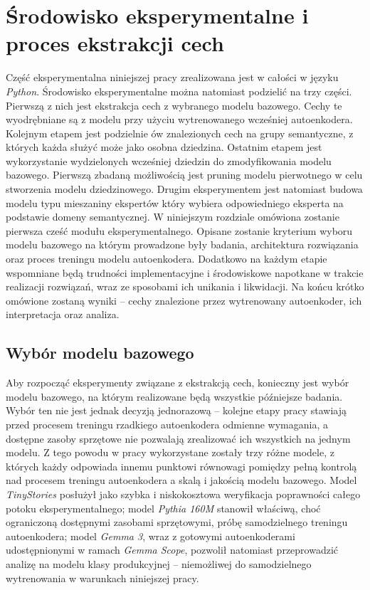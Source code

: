 \chapter{Środowisko eksperymentalne i proces ekstrakcji cech}
Część eksperymentalna niniejszej pracy zrealizowana jest w całości w języku \textit{Python}. Środowisko eksperymentalne można natomiast podzielić na trzy części. Pierwszą z nich jest ekstrakcja cech z wybranego modelu bazowego. Cechy te wyodrębniane są z modelu przy użyciu wytrenowanego wcześniej autoenkodera. Kolejnym etapem jest podzielnie ów znalezionych cech na grupy semantyczne, z których każda służyć może jako osobna dziedzina. Ostatnim etapem jest wykorzystanie wydzielonych wcześniej dziedzin do zmodyfikowania modelu bazowego. Pierwszą zbadaną możliwością jest pruning modelu pierwotnego w celu stworzenia modelu dziedzinowego. Drugim eksperymentem jest natomiast budowa modelu typu mieszaniny ekspertów który wybiera odpowiedniego eksperta na podstawie domeny semantycznej. \newline
W niniejszym rozdziale omówiona zostanie pierwsza cześć modułu eksperymentalnego. Opisane zostanie kryterium wyboru modelu bazowego na którym prowadzone były badania, architektura rozwiązania oraz proces treningu modelu autoenkodera. Dodatkowo na każdym etapie wspomniane będą trudności implementacyjne i środowiskowe napotkane w trakcie realizacji rozwiązań, wraz ze sposobami ich unikania i likwidacji. Na końcu krótko omówione zostaną wyniki -- cechy znalezione przez wytrenowany autoenkoder, ich interpretacja oraz analiza.

\section{Wybór modelu bazowego}
Aby rozpocząć eksperymenty związane z ekstrakcją cech, konieczny jest wybór modelu bazowego, na którym realizowane będą wszystkie późniejsze badania. Wybór ten nie jest jednak decyzją jednorazową -- kolejne etapy pracy stawiają przed procesem treningu rzadkiego autoenkodera odmienne wymagania, a dostępne zasoby sprzętowe nie pozwalają zrealizować ich wszystkich na jednym modelu. Z tego powodu w pracy wykorzystane zostały trzy różne modele, z których każdy odpowiada innemu punktowi równowagi pomiędzy pełną kontrolą nad procesem treningu autoenkodera a skalą i jakością modelu bazowego. Model \textit{TinyStories} posłużył jako szybka i niskokosztowa weryfikacja poprawności całego potoku eksperymentalnego; model \textit{Pythia 160M} stanowił właściwą, choć ograniczoną dostępnymi zasobami sprzętowymi, próbę samodzielnego treningu autoenkodera; model \textit{Gemma 3}, wraz z gotowymi autoenkoderami udostępnionymi w ramach \textit{Gemma Scope}, pozwolił natomiast przeprowadzić analizę na modelu klasy produkcyjnej -- niemożliwej do samodzielnego wytrenowania w warunkach niniejszej pracy.
  
